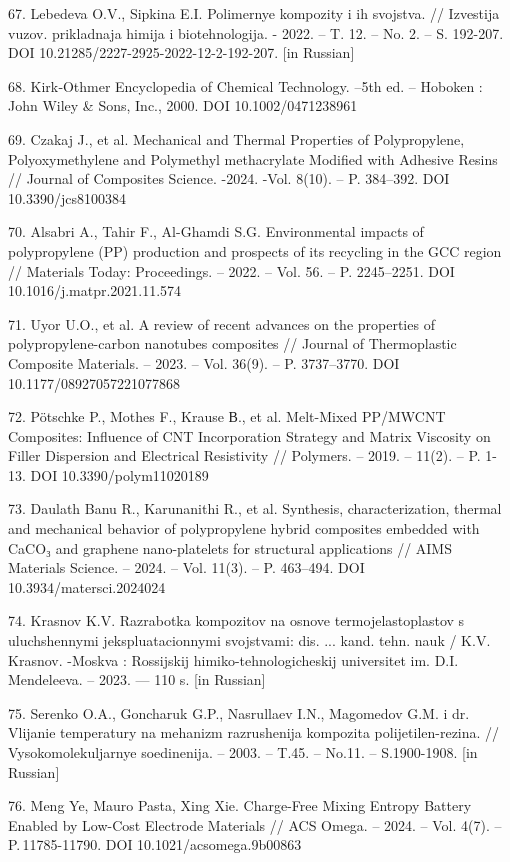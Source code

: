 \begin{references}
67. Lebedeva O.V., Sipkina E.I. Polimernye kompozity i ih svojstva. //
Izvestija vuzov. prikladnaja himija i biotehnologija. - 2022. -- T. 12.
-- No. 2. -- S. 192-207. DOI 10.21285/2227-2925-2022-12-2-192-207. {[}in
Russian{]}

68. Kirk‐Othmer Encyclopedia of Chemical Technology. --5th ed. --
Hoboken : John Wiley \& Sons, Inc., 2000. DOI 10.1002/0471238961

69. Czakaj J., et al. Mechanical and Thermal Properties of
Polypropylene, Polyoxymethylene and Poly\-methyl methacrylate Modified
with Adhesive Resins // Journal of Composites Science. -2024. -Vol.
8(10). -- P. 384--392. DOI 10.3390/jcs8100384

70. Alsabri A., Tahir F., Al-Ghamdi S.G. Environmental impacts of
polypropylene (PP) production and prospects of its recycling in the GCC
region // Materials Today: Proceedings. -- 2022. -- Vol. 56. -- P.
2245--2251. DOI 10.1016/j.matpr.2021.11.574

71. Uyor U.O., et al. A review of recent advances on the properties of
polypropylene-carbon nanotubes composites // Journal of Thermoplastic
Composite Materials. -- 2023. -- Vol. 36(9). -- P. 3737--3770. DOI
10.1177/08927057221077868

72. Pötschke P., Mothes F., Krause В., et al. Melt-Mixed PP/MWCNT
Composites: Influence of CNT Incorporation Strategy and Matrix Viscosity
on Filler Dispersion and Electrical Resistivity // Polymers. -- 2019. --
11(2). -- P. 1-13. DOI 10.3390/polym11020189

73. Daulath Banu R., Karunanithi R., et al. Synthesis, characterization,
thermal and mechanical behavior of polypropylene hybrid composites
embedded with CaCO₃ and graphene nano-platelets for structural
applications // AIMS Materials Science. -- 2024. -- Vol. 11(3). -- P.
463--494. DOI \\10.3934/matersci.2024024

74. Krasnov K.V. Razrabotka kompozitov na osnove termojelastoplastov s
uluchshennymi jekspluatacion\-nymi svojstvami: dis. ... kand. tehn. nauk /
K.V. Krasnov. -Moskva : Rossijskij himiko-tehnologicheskij universitet
im. D.I. Mendeleeva. -- 2023. --- 110 s. {[}in Russian{]}

75. Serenko O.A., Goncharuk G.P., Nasrullaev I.N., Magomedov G.M. i dr.
Vlijanie temperatury na mehanizm razrushenija kompozita
polijetilen-rezina. // Vysokomolekuljarnye soedinenija. -- 2003. --
T.45. -- No.11. -- S.1900-1908. {[}in Russian{]}

76. Meng Ye, Mauro Pasta, Xing Xie. Charge-Free Mixing Entropy Battery
Enabled by Low-Cost Electrode Materials // ACS Omega. -- 2024. -- Vol.
4(7). -- P.\,11785-11790. DOI 10.1021/acsomega.9b00863


\end{references}
